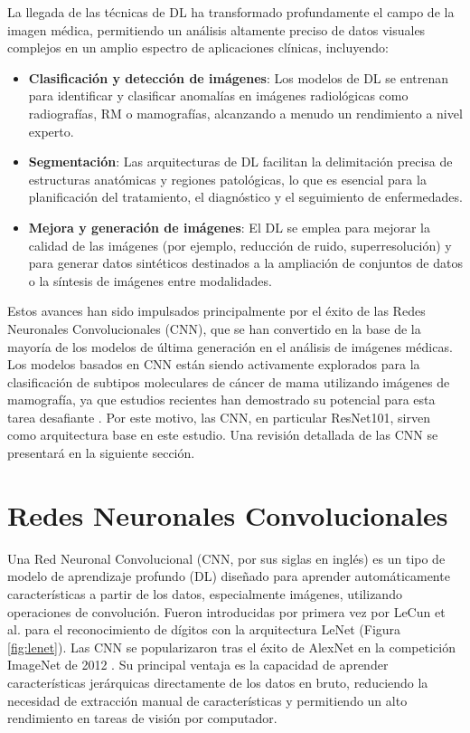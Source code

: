 \documentclass[a4paper,10pt]{book}
\begin{document}
La llegada de las técnicas de DL ha transformado profundamente el campo de la imagen médica, permitiendo un análisis altamente preciso de datos visuales complejos en un amplio espectro de aplicaciones clínicas, incluyendo:

\begin{itemize}
    \item \textbf{Clasificación y detección de imágenes}: Los modelos de DL se entrenan para identificar y clasificar anomalías en imágenes radiológicas como radiografías, RM o mamografías, alcanzando a menudo un rendimiento a nivel experto.
    \item \textbf{Segmentación}: Las arquitecturas de DL facilitan la delimitación precisa de estructuras anatómicas y regiones patológicas, lo que es esencial para la planificación del tratamiento, el diagnóstico y el seguimiento de enfermedades.
    \item \textbf{Mejora y generación de imágenes}: El DL se emplea para mejorar la calidad de las imágenes (por ejemplo, reducción de ruido, superresolución) y para generar datos sintéticos destinados a la ampliación de conjuntos de datos o la síntesis de imágenes entre modalidades.
\end{itemize}

Estos avances han sido impulsados principalmente por el éxito de las Redes Neuronales Convolucionales (CNN), que se han convertido en la base de la mayoría de los modelos de última generación en el análisis de imágenes médicas. Los modelos basados en CNN están siendo activamente explorados para la clasificación de subtipos moleculares de cáncer de mama utilizando imágenes de mamografía, ya que estudios recientes han demostrado su potencial para esta tarea desafiante \cite{mota_breast_2024, ben_rabah_multimodal_2025}. Por este motivo, las CNN, en particular ResNet101, sirven como arquitectura base en este estudio. Una revisión detallada de las CNN se presentará en la siguiente sección.


\section{Redes Neuronales Convolucionales}

Una Red Neuronal Convolucional (CNN, por sus siglas en inglés) es un tipo de modelo de aprendizaje profundo (DL) diseñado para aprender automáticamente características a partir de los datos, especialmente imágenes, utilizando operaciones de convolución. Fueron introducidas por primera vez por LeCun et al. para el reconocimiento de dígitos \cite{lecun_gradient-based_1998} con la arquitectura LeNet (Figura \ref{fig:lenet}). Las CNN se popularizaron tras el éxito de AlexNet en la competición ImageNet de 2012 \cite{NIPS2012_c399862d}. Su principal ventaja es la capacidad de aprender características jerárquicas directamente de los datos en bruto, reduciendo la necesidad de extracción manual de características y permitiendo un alto rendimiento en tareas de visión por computador.
\end{document}
